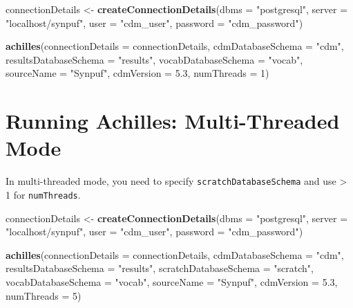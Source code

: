 \documentclass[]{article}
\newenvironment{Shaded}{\begin{snugshade}}{\end{snugshade}}
\newcommand{\KeywordTok}[1]{\textcolor[rgb]{0.13,0.29,0.53}{\textbf{#1}}}
\newcommand{\DataTypeTok}[1]{\textcolor[rgb]{0.13,0.29,0.53}{#1}}
\newcommand{\DecValTok}[1]{\textcolor[rgb]{0.00,0.00,0.81}{#1}}
\newcommand{\FloatTok}[1]{\textcolor[rgb]{0.00,0.00,0.81}{#1}}
\newcommand{\StringTok}[1]{\textcolor[rgb]{0.31,0.60,0.02}{#1}}
\newcommand{\NormalTok}[1]{#1}
\begin{document}
\begin{Shaded}
\begin{Highlighting}[]
\NormalTok{connectionDetails <-}\StringTok{ }\KeywordTok{createConnectionDetails}\NormalTok{(}\DataTypeTok{dbms =} \StringTok{"postgresql"}\NormalTok{, }
                                             \DataTypeTok{server =} \StringTok{"localhost/synpuf"}\NormalTok{, }
                                             \DataTypeTok{user =} \StringTok{"cdm_user"}\NormalTok{, }
                                             \DataTypeTok{password =} \StringTok{"cdm_password"}\NormalTok{)}

\KeywordTok{achilles}\NormalTok{(}\DataTypeTok{connectionDetails =}\NormalTok{ connectionDetails, }
         \DataTypeTok{cdmDatabaseSchema =} \StringTok{"cdm"}\NormalTok{, }
         \DataTypeTok{resultsDatabaseSchema =} \StringTok{"results"}\NormalTok{, }
         \DataTypeTok{vocabDatabaseSchema =} \StringTok{"vocab"}\NormalTok{, }
         \DataTypeTok{sourceName =} \StringTok{"Synpuf"}\NormalTok{, }
         \DataTypeTok{cdmVersion =} \FloatTok{5.3}\NormalTok{, }
         \DataTypeTok{numThreads =} \DecValTok{1}\NormalTok{)}
\end{Highlighting}
\end{Shaded}

\section{Running Achilles: Multi-Threaded
Mode}\label{running-achilles-multi-threaded-mode}

In multi-threaded mode, you need to specify
\texttt{scratchDatabaseSchema} and use \textgreater{} 1 for
\texttt{numThreads}.

\begin{Shaded}
\begin{Highlighting}[]
\NormalTok{connectionDetails <-}\StringTok{ }\KeywordTok{createConnectionDetails}\NormalTok{(}\DataTypeTok{dbms =} \StringTok{"postgresql"}\NormalTok{, }
                                             \DataTypeTok{server =} \StringTok{"localhost/synpuf"}\NormalTok{, }
                                             \DataTypeTok{user =} \StringTok{"cdm_user"}\NormalTok{, }
                                             \DataTypeTok{password =} \StringTok{"cdm_password"}\NormalTok{)}

\KeywordTok{achilles}\NormalTok{(}\DataTypeTok{connectionDetails =}\NormalTok{ connectionDetails, }
         \DataTypeTok{cdmDatabaseSchema =} \StringTok{"cdm"}\NormalTok{, }
         \DataTypeTok{resultsDatabaseSchema =} \StringTok{"results"}\NormalTok{, }
         \DataTypeTok{scratchDatabaseSchema =} \StringTok{"scratch"}\NormalTok{, }
         \DataTypeTok{vocabDatabaseSchema =} \StringTok{"vocab"}\NormalTok{, }
         \DataTypeTok{sourceName =} \StringTok{"Synpuf"}\NormalTok{, }
         \DataTypeTok{cdmVersion =} \FloatTok{5.3}\NormalTok{, }
         \DataTypeTok{numThreads =} \DecValTok{5}\NormalTok{)}
\end{Highlighting}
\end{Shaded}
\end{document}
